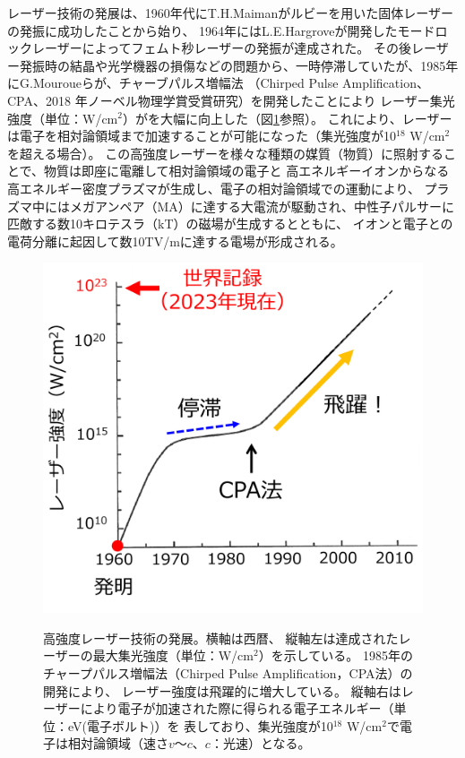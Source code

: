 \documentclass[a4paper,11pt,titlepage]{jarticle}
\numberwithin{equation}{section} %
\begin{document}
レーザー技術の発展は、1960年代にT.H.Maimanがルビーを用いた固体レーザーの発振に成功した\cite{ft1}ことから始り、
1964年にはL.E.Hargroveが開発したモードロックレーザーによってフェムト秒レーザーの発振が達成された\cite{ft2}。
その後レーザー発振時の結晶や光学機器の損傷などの問題から、一時停滞していたが、1985年にG.Mouroueらが、チャーブパルス増幅法
（Chirped Pulse Amplification、CPA、2018 年ノーベル物理学賞受賞研究）\cite{ft3}を開発したことにより
レーザー集光強度（単位：W/cm$^{2}$）がを大幅に向上した（図\ref{fig:1}参照）。
これにより、レーザーは電子を相対論領域まで加速することが可能になった（集光強度が10$^{18}$ W/cm$^{2}$を超える場合）。
この高強度レーザーを様々な種類の媒質（物質）に照射することで、物質は即座に電離して相対論領域の電子と
高エネルギーイオンからなる高エネルギー密度プラズマが生成し、電子の相対論領域での運動により、
プラズマ中にはメガアンペア（MA）に達する大電流が駆動され、中性子パルサーに匹敵する数10キロテスラ（kT）の磁場が生成するとともに、
イオンと電子との電荷分離に起因して数10TV/mに達する電場が形成される。

\begin{figure}[H]
  \begin{center}
    \includegraphics[scale=0.4]{./image/1-laser.png}
    \label{fig:1}
    \caption{高強度レーザー技術の発展。横軸は西暦、
    縦軸左は達成されたレーザーの最大集光強度（単位：W/cm$^2$）を示している。
    1985年のチャープパルス増幅法（Chirped Pulse Amplification，CPA法）の開発により、
    レーザー強度は飛躍的に増大している。
    縦軸右はレーザーにより電子が加速された際に得られる電子エネルギー（単位：eV(電子ボルト)）を
    表しており、集光強度が10$^{18}$ W/cm$^{2}$で電子は相対論領域（速さ$v$～$c$、$c$：光速）となる。}
  \end{center}
\end{figure}
\end{document}

